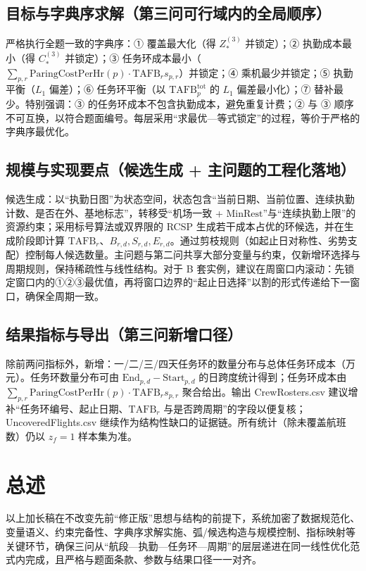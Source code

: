 \documentclass{article}
\begin{document}
\subsection{目标与字典序求解（第三问可行域内的全局顺序）}
严格执行全题一致的字典序：① 覆盖最大化（得 $Z^{(3)}_*$ 并锁定）；② 执勤成本最小（得 $C^{(3)}_*$ 并锁定）；③ 任务环成本最小（$\sum_{p,r}\mathrm{ParingCostPerHr}(p) \cdot \mathrm{TAFB}_r s_{p,r}$）并锁定；④ 乘机最少并锁定；⑤ 执勤平衡（$L_1$ 偏差）；⑥ 任务环平衡（以 $\mathrm{TAFB}^{\mathrm{tot}}_{p}$ 的 $L_1$ 偏差最小化）；⑦ 替补最少。特别强调：③ 的任务环成本不包含执勤成本，避免重复计费；② 与 ③ 顺序不可互换，以符合题面编号。每层采用“求最优—等式锁定”的过程，等价于严格的字典序最优化。

\subsection{规模与实现要点（候选生成 + 主问题的工程化落地）}
候选生成：以“执勤日图”为状态空间，状态包含“当前日期、当前位置、连续执勤计数、是否在外、基地标志”，转移受“机场一致 + $\mathrm{MinRest}$”与“连续执勤上限”的资源约束；采用标号算法或双界限的 RCSP 生成若干成本占优的环候选，并在生成阶段即计算 $\mathrm{TAFB}_r、B_{r,d},S_{r,d},E_{r,d}$。通过剪枝规则（如起止日对称性、劣势支配）控制每人候选数量。主问题与第二问共享大部分变量与约束，仅新增环选择与周期规则，保持稀疏性与线性结构。对于 B 套实例，建议在周窗口内滚动：先锁定窗口内的①②③最优值，再将窗口边界的“起止日选择”以割的形式传递给下一窗口，确保全周期一致。

\subsection{结果指标与导出（第三问新增口径）}
除前两问指标外，新增：一/二/三/四天任务环的数量分布与总体任务环成本（万元）。任务环数量分布可由 $\mathrm{End}_{p,d}-\mathrm{Start}_{p,d}$ 的日跨度统计得到；任务环成本由 $\sum_{p,r}\mathrm{ParingCostPerHr}(p) \cdot \mathrm{TAFB}_r s_{p,r}$ 聚合给出。输出 CrewRosters.csv 建议增补“任务环编号、起止日期、$\mathrm{TAFB}_r$ 与是否跨周期”的字段以便复核；UncoveredFlights.csv 继续作为结构性缺口的证据链。所有统计（除未覆盖航班数）仍以 $z_f=1$ 样本集为准。

\section*{总述}
以上加长稿在不改变先前“修正版”思想与结构的前提下，系统加密了数据规范化、变量语义、约束完备性、字典序求解实施、弧/候选构造与规模控制、指标映射等关键环节，确保三问从“航段—执勤—任务环—周期”的层层递进在同一线性优化范式内完成，且严格与题面条款、参数与结果口径一一对齐。
\end{document}
